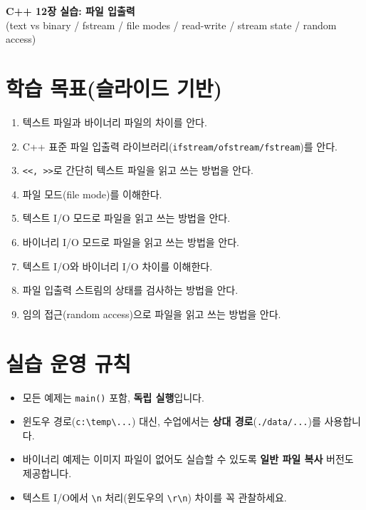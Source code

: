 \documentclass[11pt,a4paper]{article}
\begin{document}
\begin{center}
  {\LARGE \textbf{C++ 12장 실습: 파일 입출력}}\\
  \vspace{6pt}
  {\large (text vs binary / fstream / file modes / read-write / stream state / random access)}
\end{center}

\vspace{8pt}

\section*{학습 목표(슬라이드 기반)}
\begin{GoalBox}
\begin{enumerate}[leftmargin=18pt]
  \item 텍스트 파일과 바이너리 파일의 차이를 안다.
  \item C++ 표준 파일 입출력 라이브러리(\texttt{ifstream/ofstream/fstream})를 안다.
  \item \texttt{<<, >>}로 간단히 텍스트 파일을 읽고 쓰는 방법을 안다.
  \item 파일 모드(file mode)를 이해한다.
  \item 텍스트 I/O 모드로 파일을 읽고 쓰는 방법을 안다.
  \item 바이너리 I/O 모드로 파일을 읽고 쓰는 방법을 안다.
  \item 텍스트 I/O와 바이너리 I/O 차이를 이해한다.
  \item 파일 입출력 스트림의 상태를 검사하는 방법을 안다.
  \item 임의 접근(random access)으로 파일을 읽고 쓰는 방법을 안다.
\end{enumerate}
\end{GoalBox}

\section*{실습 운영 규칙}
\begin{itemize}[leftmargin=18pt]
  \item 모든 예제는 \texttt{main()} 포함, \textbf{독립 실행}입니다.
  \item 윈도우 경로(\texttt{c:\textbackslash temp\textbackslash ...}) 대신, 수업에서는 \textbf{상대 경로}(\texttt{./data/...})를 사용합니다.
  \item 바이너리 예제는 이미지 파일이 없어도 실습할 수 있도록 \textbf{일반 파일 복사} 버전도 제공합니다.
  \item 텍스트 I/O에서 \texttt{\textbackslash n} 처리(윈도우의 \texttt{\textbackslash r\textbackslash n}) 차이를 꼭 관찰하세요.
\end{itemize}
\end{document}

